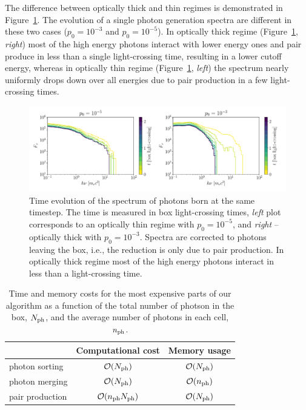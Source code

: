 The difference between optically thick and thin regimes is demonstrated in Figure~\ref{fig:pairprod-opt_thick}. The evolution of a single photon generation spectra are different in these two cases ($p_0=10^{-3}$ and $p_0=10^{-5}$). In optically thick regime (Figure~\ref{fig:pairprod-opt_thick}, {\it right}) most of the high energy photons interact with lower energy ones and pair produce in less than a single light-crossing time, resulting in a lower cutoff energy, whereas in optically thin regime (Figure~\ref{fig:pairprod-opt_thick}, {\it left}) the spectrum nearly uniformly drops down over all energies due to pair production in a few light-crossing times.

\begin{figure}[htb]
    \centering
    \includegraphics[width=.8\textwidth]{figures/ch4-pairproduction/fig_a2.pdf}
    \caption{Time evolution of the spectrum of photons born at the same timestep. The time is measured in box light-crossing times, {\it left} plot corresponds to an optically thin regime with $p_0=10^{-5}$, and {\it right} -- optically thick with $p_0=10^{-3}$. Spectra are corrected to photons leaving the box, i.e., the reduction is only due to pair production. In optically thick regime most of the high energy photons interact in less than a light-crossing time.}
    \label{fig:pairprod-opt_thick}
\end{figure}

\begin{table}
\begin{centering}
 \begin{tabular}{ l || c | c }
 \hline
  & Computational cost & Memory usage \\ [0.5ex]
 \hline\hline
 photon sorting & $\mathcal{O}(N_{\rm ph})$ & $\mathcal{O}(N_{\rm ph})$ \\
 photon merging & $\mathcal{O}(N_{\rm ph})$ & $\mathcal{O}(n_{\rm ph})$ \\
 pair production & $\mathcal{O}(n_{\rm ph} N_{\rm ph})$ & $\mathcal{O}(N_{\rm ph})$ \\ [1ex]
 \hline
\end{tabular}
\caption{Time and memory costs for the most expensive parts of our algorithm as a function of the total number of photson in the box, $N_{\rm ph}$, and the average number of photons in each cell, $n_{\rm ph}$. }
\label{table:comp}
\end{centering}
\end{table}

